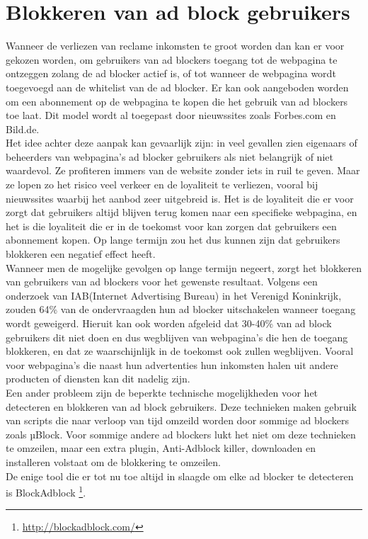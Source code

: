 \documentclass[pdftex,a4paper,12pt,twoside]{report}
\begin{document}
\section{Blokkeren van ad block gebruikers}
\label{sec Blokkeren van ad block gebruikers}
Wanneer de verliezen van reclame inkomsten te groot worden dan kan er voor gekozen worden, om gebruikers van ad blockers toegang tot de webpagina te ontzeggen zolang de ad blocker actief is, of tot wanneer de webpagina wordt toegevoegd aan de whitelist van de ad blocker. Er kan ook aangeboden worden om een abonnement op de webpagina te kopen die het gebruik van ad blockers toe laat. Dit model wordt al toegepast door nieuwssites zoals Forbes.com en Bild.de.
\\
Het idee achter deze aanpak kan gevaarlijk zijn: in veel gevallen zien eigenaars of beheerders van webpagina's ad blocker gebruikers als niet belangrijk of niet waardevol. Ze profiteren immers van de website zonder iets in ruil te geven. Maar ze lopen zo het risico veel verkeer en de loyaliteit te verliezen, vooral bij nieuwssites waarbij het aanbod zeer uitgebreid is. Het is de loyaliteit die er voor zorgt dat gebruikers altijd blijven terug komen naar een specifieke webpagina, en het is die loyaliteit die er in de toekomst voor kan zorgen dat gebruikers een abonnement kopen. Op lange termijn zou het dus kunnen zijn dat gebruikers blokkeren een negatief effect heeft.
\\
Wanneer men de mogelijke gevolgen op lange termijn negeert, zorgt het blokkeren van gebruikers van ad blockers voor het gewenste resultaat. Volgens een onderzoek van IAB(Internet Advertising Bureau) in het Verenigd Koninkrijk, zouden 64\% van de ondervraagden hun ad blocker uitschakelen wanneer toegang wordt geweigerd. Hieruit kan ook worden afgeleid dat 30-40\% van ad block gebruikers dit niet doen en dus wegblijven van webpagina's die hen de toegang blokkeren, en dat ze waarschijnlijk in de toekomst ook zullen wegblijven. Vooral voor webpagina's die naast hun advertenties hun inkomsten halen uit andere producten of diensten kan dit nadelig zijn.
\\
Een ander probleem zijn de beperkte technische mogelijkheden voor het detecteren en blokkeren van ad block gebruikers. Deze technieken maken gebruik van scripts die naar verloop van tijd omzeild worden door sommige ad blockers zoals µBlock. Voor sommige andere ad blockers lukt het niet om deze technieken te omzeilen, maar een extra plugin, Anti-Adblock killer, downloaden en installeren volstaat om de blokkering te omzeilen.
\\
De enige tool die er tot nu toe altijd in slaagde om elke ad blocker te detecteren is BlockAdblock \footnote{\url{http://blockadblock.com/}}.
\end{document}
